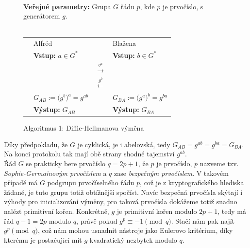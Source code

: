 \documentclass [12pt]{report}
\begin{document}
\begin{figure}[h]
\begin{center} 
\makebox[1cm]{\rule{15cm}{0.4pt}}\\
\hspace{-1.35cm} \textbf{Veřejné parametry:} Grupa $G$ řádu $p$, kde $p$ je prvočíslo, s generátorem $g$.\\

\vspace{-0.25cm}
\makebox[\linewidth]{\rule{15cm}{0.4pt}}\\
\vspace{0.2cm}
\begin{tabular}{l l c l}
\cline{2-2} \cline{4-4} 
& Alfréd & & Blažena \\ 
\cline{2-2} \cline{4-4} 
& \textbf{Vstup:} $a \in G^{*}$ & & \textbf{Vstup:} $b \in G^{*}$ \\
 & & $\stackrel{g^a}{\longrightarrow} $ &  \\
&  & $\stackrel{g^b}{\longleftarrow} $ &  \\
& $G_{AB} := \big(g^b\big)^{a} = g^{ab}$ &  & $ G_{BA} := \big(g^a\big)^{b} = g^{ba}$ \\
& \textbf{Výstup:} $G_{AB}$ & & \textbf{Výstup:} $G_{BA}$
\end{tabular}
\caption*{Algoritmus 1: Diffie-Hellmanova výměna}
\vspace{-0.8cm}
\end{center}
\end{figure}

Díky předpokladu, že $G$ je cyklická, je i abelovská, tedy $G_{AB} = g^{ab} = g^{ba} = G_{BA}$. Na konci protokolu tak mají obě strany shodné tajemství $g^{ab}$.\\

Řád $G$ se prakticky bere prvočíslo $q = 2p+1$, že $p$ je prvočíslo, $p$ nazveme tzv. \textit{Sophie-Germainovým prvočíslem} a $q$ zase \textit{bezpečným prvočíslem}. V takovém případě má $G$ podgrupu prvočíselného řádu $p$, což je z kryptografického hlediska žádané, je tuto grupu totiž obtížnější spočíst. Navíc bezpečná prvočísla skýtají i výhody pro inicializování výměny, pro taková prvočísla dokážeme totiž snadno nalézt primitivní kořen. Konkrétně, $g$ je primitivní kořen modulo $2p+1$, tedy má řád $q-1 = 2p$ modulo $q$, právě pokud $g^{p} \equiv -1 \pmod{q}$. Stačí nám pak najít $g^{p} \pmod{q}$, což nám mohou usnadnit nástroje jako Eulerovo kritérium, díky kterému je postačující mít $g$ kvadratický nezbytek modulo $q$.\\
\end{document}
